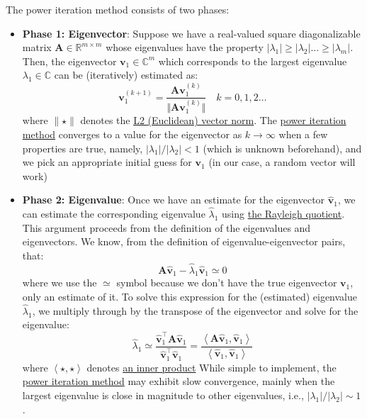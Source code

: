 \documentclass{article}[11pt]
\begin{document}
\begin{mdframed}
The power iteration method consists of two phases:
\begin{itemize}[leftmargin=16pt]
\item{\textbf{Phase 1: Eigenvector}: Suppose we have a real-valued square diagonalizable matrix $\mathbf{A}\in\mathbb{R}^{m\times{m}}$ whose eigenvalues have the property $|\lambda_{1}|\geq|\lambda_{2}|\dots\geq|\lambda_{m}|$. 
   Then, the eigenvector $\mathbf{v}_{1}\in\mathbb{C}^{m}$ which corresponds to the largest eigenvalue $\lambda_{1}\in\mathbb{C}$ can be (iteratively) estimated as:
   \begin{equation}
      \mathbf{v}_{1}^{(k+1)} = \frac{\mathbf{A}\mathbf{v}_{1}^{(k)}}{\Vert \mathbf{A}\mathbf{v}_{1}^{(k)} \Vert}\quad{k=0,1,2\dots}
   \end{equation}
   where $\lVert \star \rVert$ denotes the \href{https://mathworld.wolfram.com/L2-Norm.html}{L2 (Euclidean) vector norm}. 
   The \href{https://en.wikipedia.org/wiki/Power_iteration}{power iteration method} converges to a value for the eigenvector as $k\rightarrow\infty$ 
   when a few properties are true, namely, $|\lambda_{1}|/|\lambda_{2}| < 1$ (which is unknown beforehand), and we pick an appropriate initial guess for $\mathbf{v}_{1}$ (in our case, a random vector will work)
}
\item{\textbf{Phase 2: Eigenvalue}: Once we have an estimate for the eigenvector $\hat{\mathbf{v}}_{1}$, we can estimate the corresponding eigenvalue $\hat{\lambda}_{1}$ using \href{https://en.wikipedia.org/wiki/Rayleigh_quotient}{the Rayleigh quotient}. 
   This argument proceeds from the definition of the eigenvalues and eigenvectors. We know, from the definition of eigenvalue-eigenvector pairs, that:
   \begin{equation}
      \mathbf{A}\hat{\mathbf{v}}_{1} - \hat{\lambda}_{1}\hat{\mathbf{v}}_{1}\simeq{0}
   \end{equation}
where we use the $\simeq$ symbol because we don't have the true eigenvector $\mathbf{v}_{1}$, only an estimate of it. To solve this expression for the (estimated) eigenvalue $\hat{\lambda}_{1}$, we multiply through by the transpose of the eigenvector and solve for the eigenvalue:
   \begin{equation}
      \hat{\lambda}_{1} \simeq \frac{\hat{\mathbf{v}}_{1}^{\top}\mathbf{A}\hat{\mathbf{v}}_{1}}{\hat{\mathbf{v}}_{1}^{\top}\hat{\mathbf{v}}_{1}} = \frac{\left<\mathbf{A}\hat{\mathbf{v}}_{1},\hat{\mathbf{v}}_{1}\right>}{\left<\hat{\mathbf{v}}_{1},\hat{\mathbf{v}}_{1}\right>}
   \end{equation}
where $\left<\star,\star\right>$ denotes \href{https://mathworld.wolfram.com/InnerProduct.html}{an inner product}}
While simple to implement, the \href{https://en.wikipedia.org/wiki/Power_iteration}{power iteration method} may exhibit slow convergence, mainly when the largest eigenvalue is close in magnitude to other eigenvalues, i.e., $|\lambda_{1}|/|\lambda_{2}| \sim 1$.
\end{itemize}
\end{mdframed}
\end{document}
